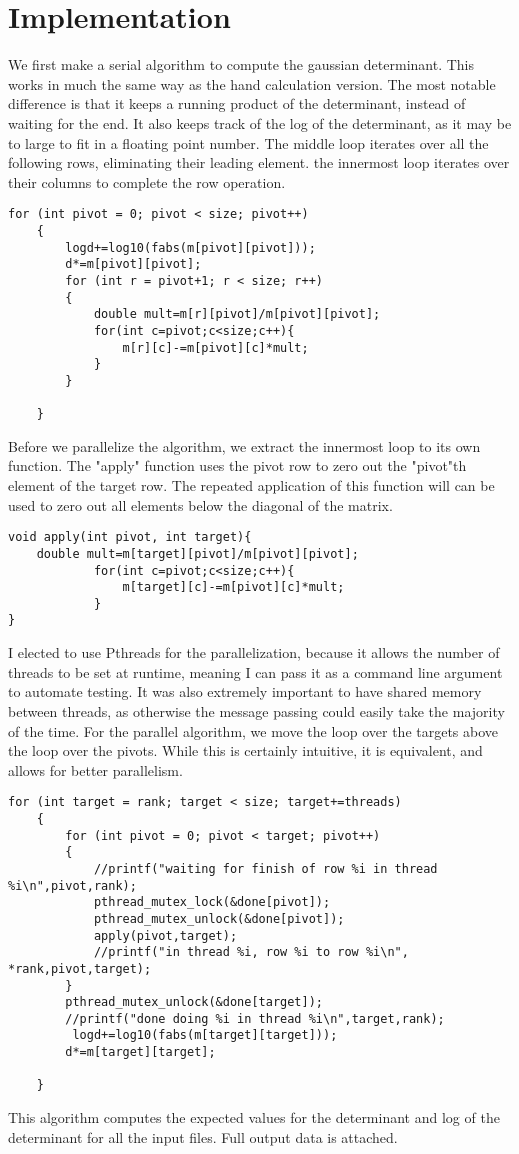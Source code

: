 \documentclass{article}
\begin{document}
\section{Implementation}
We first make a serial algorithm to compute the gaussian determinant. This works in much the same way as the hand calculation version. The most notable difference is that it keeps a running product of the determinant, instead of waiting for the end. It also keeps track of the log of the determinant, as it may be to large to fit in a floating point number. The middle loop iterates over all the following rows, eliminating their leading element. the innermost loop iterates over their columns to complete the row operation.
\begin{lstlisting}[style=CStyle]
for (int pivot = 0; pivot < size; pivot++)
    {
        logd+=log10(fabs(m[pivot][pivot]));
        d*=m[pivot][pivot];
        for (int r = pivot+1; r < size; r++)
        {
            double mult=m[r][pivot]/m[pivot][pivot];
            for(int c=pivot;c<size;c++){
                m[r][c]-=m[pivot][c]*mult;
            }
        }
        
    }
\end{lstlisting}
Before we parallelize the algorithm, we extract the innermost loop to its own function. The "apply" function uses the pivot row to zero out the "pivot"th element of the target row. The repeated application of this function will can be used to zero out all elements below the diagonal of the matrix.
\begin{lstlisting}[style=CStyle]
void apply(int pivot, int target){
    double mult=m[target][pivot]/m[pivot][pivot];
            for(int c=pivot;c<size;c++){
                m[target][c]-=m[pivot][c]*mult;
            }
}
\end{lstlisting}
I elected to use Pthreads for the parallelization, because it allows the number of threads to be set at runtime, meaning I can pass it as a command line argument to automate testing. It was also extremely important to have shared memory between threads, as otherwise the message passing could easily take the majority of the time.
For the parallel algorithm, we move the loop over the targets above the loop over the pivots. While this is certainly intuitive, it is equivalent, and allows for better parallelism.
\begin{lstlisting}[style=CStyle]
for (int target = rank; target < size; target+=threads)
    {
        for (int pivot = 0; pivot < target; pivot++)
        {
            //printf("waiting for finish of row %i in thread %i\n",pivot,rank);
            pthread_mutex_lock(&done[pivot]);
            pthread_mutex_unlock(&done[pivot]);
            apply(pivot,target);
            //printf("in thread %i, row %i to row %i\n", *rank,pivot,target);
        }
        pthread_mutex_unlock(&done[target]);
        //printf("done doing %i in thread %i\n",target,rank);
         logd+=log10(fabs(m[target][target]));
        d*=m[target][target];
        
    }
\end{lstlisting}
This algorithm computes the expected values for the determinant and log of the determinant for all the input files. Full output data is attached.
\end{document}
